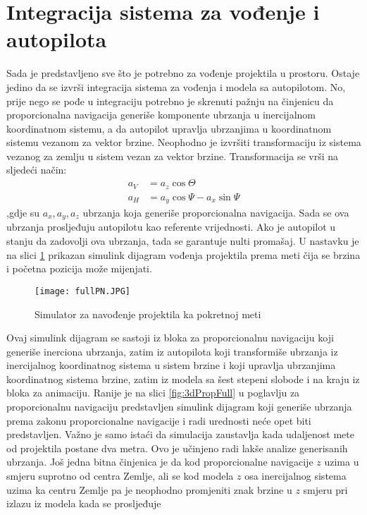 \section{Integracija sistema za vođenje i autopilota}
Sada je predstavljeno sve što je potrebno za vođenje projektila u prostoru.
Ostaje jedino da se izvrši integracija sistema za vođenja i modela sa autopilotom. 
No, prije nego se pođe u integraciju potrebno je skrenuti pažnju na činjenicu da 
proporcionalna navigacija generiše komponente ubrzanja u inercijalnom koordinatnom sistemu, a 
da autopilot upravlja ubrzanjima u koordinatnom sistemu vezanom za vektor brzine. Neophodno 
je izvršiti transformaciju iz sistema vezanog za zemlju u sistem vezan za vektor brzine. 
Transformacija se vrši na sljedeći način:
\begin{align}
 \label{eq:wind1} a_{V} &= a_z\cos\Theta\\ 
 \label{eq:wind2} a_{H} &= a_y\cos\Psi - a_x\sin\Psi
\end{align}
,gdje su $a_x,a_y,a_z$ ubrzanja koja generiše proporcionalna navigacija. 
Sada se ova ubrzanja prosljeđuju autopilotu kao referente vrijednosti. Ako je autopilot 
u stanju da zadovolji ova ubrzanja, tada se garantuje nulti promašaj. 
U nastavku je na slici \ref{fig:fullPN} prikazan simulink dijagram vođenja projektila prema meti čija se brzina i 
početna pozicija može mijenjati. 
\begin{figure}[!ht]
    \centering
    \texttt{[image: fullPN.JPG]}
    \caption{Simulator za navođenje projektila ka pokretnoj meti}
    \label{fig:fullPN}
\end{figure}
Ovaj simulink dijagram se sastoji iz bloka za proporcionalnu navigaciju koji generiše inerciona ubrzanja, 
zatim iz autopilota koji transformiše ubrzanja iz inercijalnog koordinatnog sistema u 
sistem brzine i koji upravlja ubrzanjima koordinatnog sistema brzine, zatim iz modela sa 
šest stepeni slobode i na kraju iz bloka za animaciju. Ranije je na slici \ref{fig:3dPropFull} u poglavlju 
za proporcionalnu navigaciju predstavljen simulink dijagram koji generiše ubrzanja 
prema zakonu proporcionalne navigacije i radi urednosti neće opet biti predstavljen. 
Važno je samo istaći da simulacija zaustavlja kada udaljenost mete od projektila 
postane dva metra. Ovo je učinjeno radi lakše analize generisanih ubrzanja. Još jedna bitna 
činjenica je da kod proporcionalne navigacije $z$ uzima u smjeru suprotno od 
centra Zemlje, ali se kod modela $z$ osa inercijalnog sistema uzima ka centru Zemlje 
pa je neophodno promjeniti znak brzine u $z$ smjeru pri izlazu iz modela kada se prosljeđuje 
